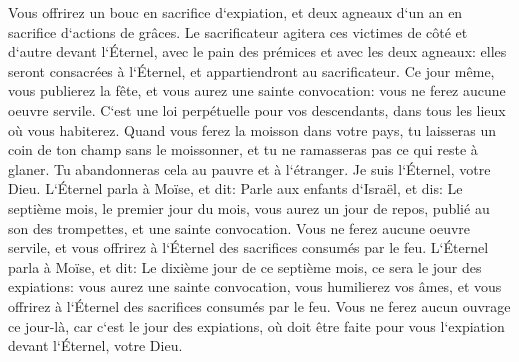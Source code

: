 \verse Vous offrirez un bouc en sacrifice d`expiation, et deux agneaux d`un an en sacrifice d`actions de grâces. 
\verse Le sacrificateur agitera ces victimes de côté et d`autre devant l`Éternel, avec le pain des prémices et avec les deux agneaux: elles seront consacrées à l`Éternel, et appartiendront au sacrificateur. 
\verse Ce jour même, vous publierez la fête, et vous aurez une sainte convocation: vous ne ferez aucune oeuvre servile. C`est une loi perpétuelle pour vos descendants, dans tous les lieux où vous habiterez. 
\verse Quand vous ferez la moisson dans votre pays, tu laisseras un coin de ton champ sans le moissonner, et tu ne ramasseras pas ce qui reste à glaner. Tu abandonneras cela au pauvre et à l`étranger. Je suis l`Éternel, votre Dieu. 
\verse L`Éternel parla à Moïse, et dit: 
\verse Parle aux enfants d`Israël, et dis: Le septième mois, le premier jour du mois, vous aurez un jour de repos, publié au son des trompettes, et une sainte convocation. 
\verse Vous ne ferez aucune oeuvre servile, et vous offrirez à l`Éternel des sacrifices consumés par le feu. 
\verse L`Éternel parla à Moïse, et dit: 
\verse Le dixième jour de ce septième mois, ce sera le jour des expiations: vous aurez une sainte convocation, vous humilierez vos âmes, et vous offrirez à l`Éternel des sacrifices consumés par le feu. 
\verse Vous ne ferez aucun ouvrage ce jour-là, car c`est le jour des expiations, où doit être faite pour vous l`expiation devant l`Éternel, votre Dieu. 
